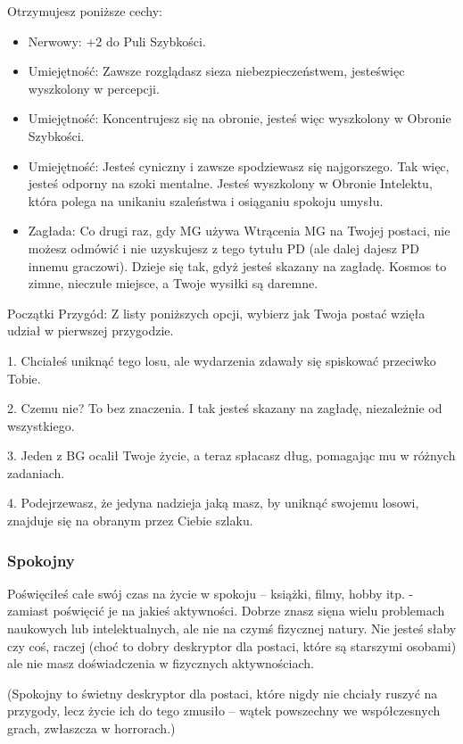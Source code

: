 Otrzymujesz poniższe cechy:
\begin{itemize}
    \item  Nerwowy: +2 do Puli Szybkości.
    \item  Umiejętność: Zawsze rozglądasz sieza niebezpieczeństwem, jesteświęc wyszkolony w percepcji.
    \item  Umiejętność: Koncentrujesz się na obronie, jesteś więc wyszkolony w Obronie Szybkości.
    \item  Umiejętność: Jesteś cyniczny i zawsze spodziewasz się najgorszego. Tak więc, jesteś odporny na szoki mentalne. Jesteś wyszkolony w Obronie Intelektu, która polega na unikaniu szaleństwa i osiąganiu spokoju umysłu.
    \item  Zagłada: Co drugi raz, gdy MG używa Wtrącenia MG na Twojej postaci, nie możesz odmówić i nie uzyskujesz z tego tytułu PD (ale dalej dajesz PD innemu graczowi). Dzieje się tak, gdyż jesteś skazany na zagładę. Kosmos to zimne, nieczułe miejsce, a Twoje wysiłki są daremne.
\end{itemize}

Początki Przygód: Z listy poniższych opcji, wybierz jak Twoja postać wzięła udział w pierwszej przygodzie.

1. Chciałeś uniknąć tego losu, ale wydarzenia zdawały się spiskować przeciwko Tobie.

2. Czemu nie? To bez znaczenia. I tak jesteś skazany na zagładę, niezależnie od wszystkiego.

3. Jeden z BG ocalił Twoje życie, a teraz spłacasz dług, pomagając mu w różnych zadaniach.

4. Podejrzewasz, że jedyna nadzieja jaką masz, by uniknąć swojemu losowi, znajduje się na obranym przez Ciebie szlaku.

\subsubsection{Spokojny}

Poświęciłeś całe swój czas na życie w spokoju – książki, filmy, hobby itp. - zamiast poświęcić je na jakieś aktywności. Dobrze znasz sięna wielu problemach naukowych lub intelektualnych, ale nie na czymś fizycznej natury. Nie jesteś słaby czy coś, raczej (choć to dobry deskryptor dla postaci, które są starszymi osobami) ale nie masz doświadczenia w fizycznych aktywnościach.

(Spokojny to świetny deskryptor dla postaci, które nigdy nie chciały ruszyć na przygody, lecz życie ich do tego zmusiło – wątek powszechny we współczesnych grach, zwłaszcza w horrorach.)

